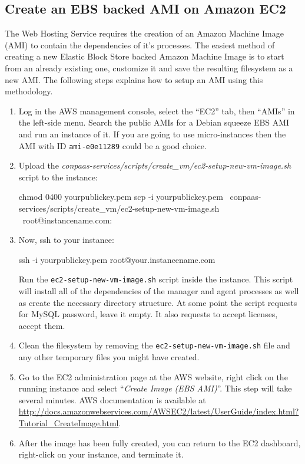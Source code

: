 \documentclass[10pt]{article}
\begin{document}
\subsection{Create an EBS backed AMI on Amazon EC2}

The Web Hosting Service requires the creation of an Amazon Machine
Image (AMI) to contain the dependencies of it's processes.  The
easiest method of creating a new Elastic Block Store backed Amazon
Machine Image is to start from an already existing one, customize it
and save the resulting filesystem as a new AMI. The following steps
explains how to setup an AMI using this methodology.

\begin{enumerate}
\item Log in the AWS management console, select the ``EC2'' tab, then
  ``AMIs'' in the left-side menu. Search the public AMIs for a Debian
  squeeze EBS AMI and run an instance of it. If you are going to use
  micro-instances then the AMI with ID \verb+ami-e0e11289+ could be a
  good choice.

\item Upload the \textit{conpaas-services/scripts/create\_vm/ec2-setup-new-vm-image.sh} script to the instance:
  \begin{code}
    chmod 0400 yourpublickey.pem
    scp -i yourpublickey.pem \
      conpaas-services/scripts/create_vm/ec2-setup-new-vm-image.sh \
      root@instancename.com:
  \end{code}

\item Now, ssh to your instance:
  \begin{code}
    ssh -i yourpublickey.pem root@your.instancename.com
  \end{code}
  Run the \verb+ec2-setup-new-vm-image.sh+ script inside the instance.
  This script will install all of the dependencies of the manager and
  agent processes as well as create the necessary directory structure.
  At some point the script requests for MySQL password, leave it
  empty. It also requests to accept licenses, accept them.

\item Clean the filesystem by removing the
  \verb+ec2-setup-new-vm-image.sh+ file and any other temporary files you might
  have created.

\item Go to the EC2 administration page at the AWS website, right
  click on the running instance and select ``\emph{Create Image (EBS
    AMI)}''.  This step will take several minutes. AWS documentation
  is available at
  \url{http://docs.amazonwebservices.com/AWSEC2/latest/UserGuide/index.html?Tutorial\_CreateImage.html}.

\item After the image has been fully created, you can return to the
  EC2 dashboard, right-click on your instance, and terminate it.
\end{enumerate}
\end{document}
